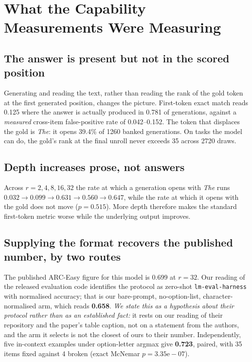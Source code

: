 \documentclass{zapiski}
\begin{document}
\section{What the Capability Measurements Were Measuring}

\subsection{The answer is present but not in the scored position}

Generating and reading the text, rather than reading the rank of the gold token at the first
generated position, changes the picture. First-token exact match reads 0.125 where the answer is
actually produced in 0.781 of generations, against a \emph{measured} cross-item false-positive
rate of 0.042--0.152. The token that displaces the gold is \emph{The}: it opens 39.4\% of 1260
banked generations. On tasks the model can do, the gold's rank at the final unroll never exceeds
35 across 2720 draws.

\subsection{Depth increases prose, not answers}

Across $r = 2,4,8,16,32$ the rate at which a generation opens with \emph{The} runs
$0.032 \rightarrow 0.099 \rightarrow 0.631 \rightarrow 0.560 \rightarrow 0.647$, while the rate at
which it opens with the gold does not move ($p = 0.515$). More depth therefore makes the standard
first-token metric worse while the underlying output improves.

\subsection{Supplying the format recovers the published number, by two routes}

The published ARC-Easy figure for this model is 0.699 at $r = 32$. Our reading of the released
evaluation code identifies the protocol as zero-shot \texttt{lm-eval-harness} with normalised
accuracy; that is our bare-prompt, no-option-list, character-normalised arm, which reads
\textbf{0.658}. \emph{We state this as a hypothesis about their protocol rather than as an
established fact:} it rests on our reading of their repository and the paper's table caption, not
on a statement from the authors, and the arm it selects is not the closest of ours to their
number.
Independently, five in-context examples under option-letter argmax give \textbf{0.723}, paired,
with 35 items fixed against 4 broken (exact McNemar $p = 3.35\mathrm{e}{-}07$).
\end{document}
